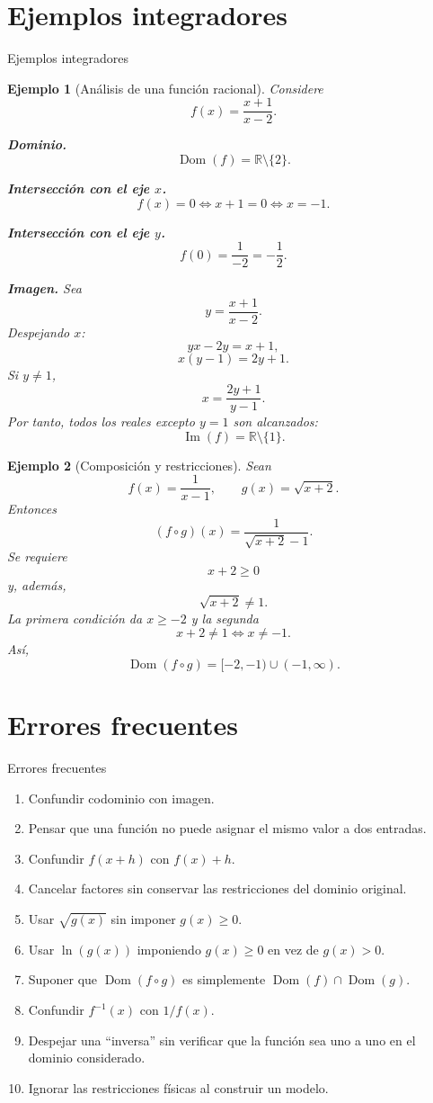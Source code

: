 \documentclass[aspectratio=169,10pt]{beamer}
\newtheorem{ejemplo}{Ejemplo}
\newcommand{\R}{\mathbb{R}}
\newcommand{\Dom}{\operatorname{Dom}}
\newcommand{\Ima}{\operatorname{Im}}
\begin{document}
\section{Ejemplos integradores}
\begin{frame}{Ejemplos integradores}
\begin{ejemplo}[Análisis de una función racional]
Considere
\[
f(x)=\frac{x+1}{x-2}.
\]

\textbf{Dominio.}
\[
\Dom(f)=\R\setminus\{2\}.
\]

\textbf{Intersección con el eje $x$.}
\[
f(x)=0
\Longleftrightarrow x+1=0
\Longleftrightarrow x=-1.
\]

\textbf{Intersección con el eje $y$.}
\[
f(0)=\frac{1}{-2}=-\frac12.
\]

\textbf{Imagen.}
Sea
\[
y=\frac{x+1}{x-2}.
\]
Despejando $x$:
\[
yx-2y=x+1,
\]
\[
x(y-1)=2y+1.
\]
Si $y\neq1$,
\[
x=\frac{2y+1}{y-1}.
\]
Por tanto, todos los reales excepto $y=1$ son alcanzados:
\[
\Ima(f)=\R\setminus\{1\}.
\]
\end{ejemplo}

\begin{ejemplo}[Composición y restricciones]
Sean
\[
f(x)=\frac{1}{x-1},
\qquad
g(x)=\sqrt{x+2}.
\]
Entonces
\[
(f\circ g)(x)
=\frac{1}{\sqrt{x+2}-1}.
\]
Se requiere
\[
x+2\geq0
\]
y, además,
\[
\sqrt{x+2}\neq1.
\]
La primera condición da $x\geq-2$ y la segunda
\[
x+2\neq1\Longleftrightarrow x\neq-1.
\]
Así,
\[
\Dom(f\circ g)=[-2,-1)\cup(-1,\infty).
\]
\end{ejemplo}

\end{frame}
\section{Errores frecuentes}
\begin{frame}{Errores frecuentes}
\begin{enumerate}
    \item Confundir codominio con imagen.
    \item Pensar que una función no puede asignar el mismo valor a dos entradas.
    \item Confundir $f(x+h)$ con $f(x)+h$.
    \item Cancelar factores sin conservar las restricciones del dominio original.
    \item Usar $\sqrt{g(x)}$ sin imponer $g(x)\geq0$.
    \item Usar $\ln(g(x))$ imponiendo $g(x)\geq0$ en vez de $g(x)>0$.
    \item Suponer que $\Dom(f\circ g)$ es simplemente
    $\Dom(f)\cap\Dom(g)$.
    \item Confundir $f^{-1}(x)$ con $1/f(x)$.
    \item Despejar una ``inversa'' sin verificar que la función sea uno a uno en
    el dominio considerado.
    \item Ignorar las restricciones físicas al construir un modelo.
\end{enumerate}

\end{frame}
\end{document}
